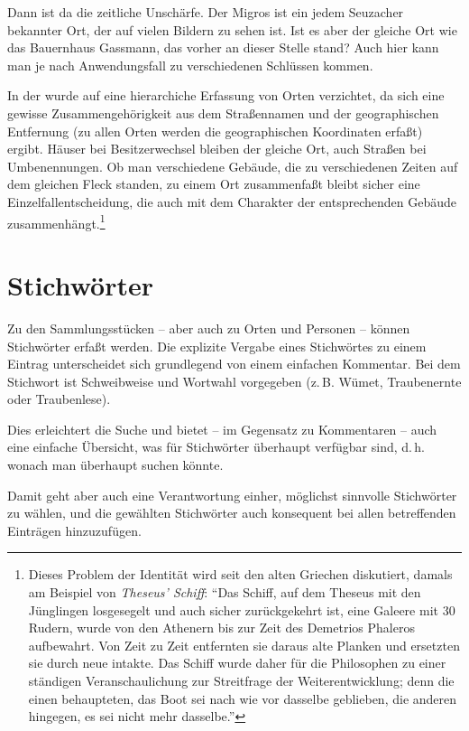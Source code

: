 \documentclass[12pt]{scrreprt}
\begin{document}
Dann ist da die zeitliche Unschärfe. Der Migros ist ein jedem Seuzacher bekannter
Ort, der auf vielen Bildern zu sehen ist. Ist es aber der gleiche Ort wie das
Bauernhaus Gassmann, das vorher an dieser Stelle stand? Auch hier kann man je nach
Anwendungsfall zu verschiedenen Schlüssen kommen.

In der \DB{} wurde auf eine hierarchiche Erfassung von Orten
verzichtet, da sich eine gewisse Zusammengehörigkeit aus dem
Straßennamen und der geographischen Entfernung (zu allen Orten werden
die geographischen Koordinaten erfaßt) ergibt. Häuser bei
Besitzerwechsel bleiben der gleiche Ort, auch Straßen bei
Umbenennungen. Ob man verschiedene Gebäude, die zu verschiedenen
Zeiten auf dem gleichen Fleck standen, zu einem Ort zusammenfaßt
bleibt sicher eine Einzelfallentscheidung, die auch mit dem Charakter
der entsprechenden Gebäude zusammenhängt.\footnote{Dieses Problem der
  Identität wird seit den alten Griechen diskutiert, damals am
  Beispiel von \textit{Theseus' Schiff}: ``Das Schiff, auf dem Theseus
  mit den Jünglingen losgesegelt und auch sicher zurückgekehrt ist,
  eine Galeere mit 30 Rudern, wurde von den Athenern bis zur Zeit des
  Demetrios Phaleros aufbewahrt. Von Zeit zu Zeit entfernten sie
  daraus alte Planken und ersetzten sie durch neue intakte. Das Schiff
  wurde daher für die Philosophen zu einer ständigen Veranschaulichung
  zur Streitfrage der Weiterentwicklung; denn die einen behaupteten,
  das Boot sei nach wie vor dasselbe geblieben, die anderen hingegen,
  es sei nicht mehr dasselbe.''}

\section{Stichwörter} Zu den Sammlungsstücken -- aber auch zu Orten und Personen --
können Stichwörter erfaßt werden. Die explizite Vergabe eines
Stichwörtes zu einem Eintrag unterscheidet sich grundlegend von einem
einfachen Kommentar. Bei dem Stichwort ist Schweibweise und Wortwahl
vorgegeben (z.\,B. Wümet, Traubenernte oder Traubenlese).

Dies erleichtert die Suche und bietet -- im Gegensatz zu Kommentaren
-- auch eine einfache Übersicht, was für Stichwörter überhaupt
verfügbar sind, d.\,h.  wonach man überhaupt suchen könnte.

Damit geht aber auch eine Verantwortung einher, möglichst sinnvolle
Stichwörter zu wählen, und die gewählten Stichwörter auch konsequent
bei allen betreffenden Einträgen hinzuzufügen.
\end{document}
